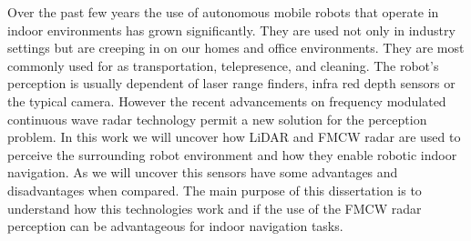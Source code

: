 \TitlePage
  \vspace*{55mm}
       {Over the past few years the use of autonomous mobile robots that operate in indoor environments has grown significantly. They are used not only in industry settings but are creeping in on our homes and office environments. They are most commonly used for as transportation, telepresence, and cleaning. The robot's perception is usually dependent of laser range finders, infra red depth sensors or the typical camera. However the recent advancements on frequency modulated continuous wave radar technology permit a new solution for the perception problem. In this work we will uncover how \ac{LiDAR} and \ac{FMCW} \ac{radar} are used to perceive the surrounding robot environment and how they enable robotic indoor navigation. As we will uncover this sensors have some advantages and disadvantages when compared. The main purpose of this dissertation is to understand how this technologies work and if the use of the \ac{FMCW} \ac{radar} perception can be advantageous for indoor navigation tasks. 
       }
       \TEXT{}     
       {%
        }
